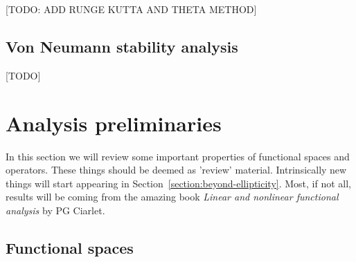 \documentclass{article}
\begin{document}
    [TODO: ADD RUNGE KUTTA AND THETA METHOD]
\subsection{Von Neumann stability analysis}
[TODO]

\section{Analysis preliminaries}
In this section we will review some important properties of functional spaces and operators. These things should be deemed as 'review' material. Intrinsically new things will start appearing in Section~\ref{section:beyond-ellipticity}. Most, if not all, results will be coming from the amazing book \emph{Linear and nonlinear functional analysis} by PG Ciarlet.

\subsection{Functional spaces}
\end{document}
